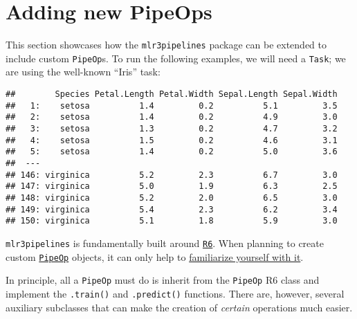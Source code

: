 \documentclass[
]{scrbook}
\newenvironment{Shaded}{\begin{snugshade}}{\end{snugshade}}
\newcommand{\FunctionTok}[1]{\textcolor[rgb]{0.00,0.00,0.00}{#1}}
\newcommand{\NormalTok}[1]{#1}
\newcommand{\OtherTok}[1]{\textcolor[rgb]{0.56,0.35,0.01}{#1}}
\newcommand{\SpecialCharTok}[1]{\textcolor[rgb]{0.00,0.00,0.00}{#1}}
\newcommand{\StringTok}[1]{\textcolor[rgb]{0.31,0.60,0.02}{#1}}
\renewenvironment{Shaded} {\begin{snugshade}\small} {\end{snugshade}}
\begin{document}
\hypertarget{extending-pipeops}{%
\section{Adding new PipeOps}\label{extending-pipeops}}

This section showcases how the \texttt{mlr3pipelines} package can be extended to include custom \texttt{PipeOp}s.
To run the following examples, we will need a \texttt{Task}; we are using the well-known ``Iris'' task:

\begin{Shaded}
\end{Shaded}

\begin{verbatim}
##        Species Petal.Length Petal.Width Sepal.Length Sepal.Width
##   1:    setosa          1.4         0.2          5.1         3.5
##   2:    setosa          1.4         0.2          4.9         3.0
##   3:    setosa          1.3         0.2          4.7         3.2
##   4:    setosa          1.5         0.2          4.6         3.1
##   5:    setosa          1.4         0.2          5.0         3.6
##  ---                                                            
## 146: virginica          5.2         2.3          6.7         3.0
## 147: virginica          5.0         1.9          6.3         2.5
## 148: virginica          5.2         2.0          6.5         3.0
## 149: virginica          5.4         2.3          6.2         3.4
## 150: virginica          5.1         1.8          5.9         3.0
\end{verbatim}

\texttt{mlr3pipelines} is fundamentally built around \href{https://r6.r-lib.org/}{\texttt{R6}}. When planning to create custom \href{https://mlr3pipelines.mlr-org.com/reference/PipeOp.html}{\texttt{PipeOp}} objects, it can only help to \href{https://adv-r.hadley.nz/r6.html}{familiarize yourself with it}.

In principle, all a \texttt{PipeOp} must do is inherit from the \texttt{PipeOp} R6 class and implement the \texttt{.train()} and \texttt{.predict()} functions.
There are, however, several auxiliary subclasses that can make the creation of \emph{certain} operations much easier.
\end{document}
